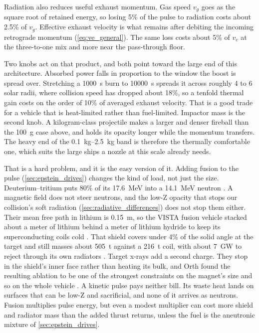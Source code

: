 \documentclass{article}
\begin{document}
Radiation also reduces useful exhaust momentum. Gas speed $v_g$ goes as the square root of retained energy, so losing 5\% of the pulse to radiation costs about 2.5\% of $v_g$. Effective exhaust velocity is what remains after debiting the incoming retrograde momentum (\autoref{eq:ve_general}). The same loss costs about 5\% of $v_e$ at the three-to-one mix and more near the pass-through floor.

Two knobs act on that product, and both point toward the large end of this architecture. Absorbed power falls in proportion to the window the boost is spread over. Stretching a \SI{1000}{\second} burn to \SI{10000}{\second} spreads it across roughly 4 to 6 solar radii, where collision speed has dropped about 18\%, so a tenfold thermal gain costs on the order of 10\% of averaged exhaust velocity. That is a good trade for a vehicle that is heat-limited rather than fuel-limited. Impactor mass is the second knob. A kilogram-class projectile makes a larger and denser fireball than the \SI{100}{\gram} case above, and holds its opacity longer while the momentum transfers. The heavy end of the \SIrange{0.1}{2.5}{\kilo\gram} band is therefore the thermally comfortable one, which suits the large ships a nozzle at this scale already needs.

That is a hard problem, and it is the easy version of it. Adding fusion to the pulse (\autoref{sec:epstein_drives}) changes the kind of load, not just the size. Deuterium--tritium puts 80\% of its \SI{17.6}{\mega\electronvolt} into a \SI{14.1}{\mega\electronvolt} neutron \cite{orth2003vista}. A magnetic field does not steer neutrons, and the low-Z opacity that stops our collision's soft radiation (\autoref{sec:radiative_differences}) does not stop them either. Their mean free path in lithium is \SI{0.15}{\meter}, so the VISTA fusion vehicle stacked about a meter of lithium behind a meter of lithium hydride to keep its superconducting coils cold \cite{orth2003vista}. That shield covers under 4\% of the solid angle at the target and still masses about \SI{505}{\tonne} against a \SI{216}{\tonne} coil, with about \SI{7}{\giga\watt} to reject through its own radiators \cite{orth2003vista}. Target x-rays add a second charge. They stop in the shield's inner face rather than heating its bulk, and Orth found the resulting ablation to be one of the strongest constraints on the magnet's size and so on the whole vehicle \cite{orth2003vista}. A kinetic pulse pays neither bill. Its waste heat lands on surfaces that can be low-Z and sacrificial, and none of it arrives as neutrons. Fusion multiplies pulse energy, but even a modest multiplier can cost more shield and radiator mass than the added thrust returns, unless the fuel is the aneutronic mixture of \autoref{sec:epstein_drives}.
\end{document}
